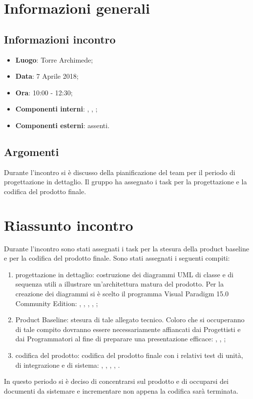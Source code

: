 \section{Informazioni generali}
\subsection{Informazioni incontro}
\begin{itemize}
\item \textbf{Luogo}: Torre Archimede;
\item \textbf{Data}: 7 Aprile 2018;
\item \textbf{Ora}: 10:00 - 12:30;
\item \textbf{Componenti interni}: \Tommaso, \Mattia, \Isacco;
\item \textbf{Componenti esterni}: assenti.
\end{itemize}

\subsection{Argomenti}
Durante l'incontro si è discusso della pianificazione del team per il periodo di progettazione in dettaglio. Il gruppo ha assegnato i task per la progettazione e la codifica del prodotto finale.

\section{Riassunto incontro}
Durante l'incontro sono stati assegnati i task per la stesura della product baseline e per la codifica del prodotto finale. Sono stati assegnati i seguenti compiti:
\begin{enumerate}
	\item progettazione in dettaglio: costruzione dei diagrammi UML di classe e di sequenza utili a illustrare un'architettura matura del prodotto. Per la creazione dei diagrammi si è scelto il programma Visual Paradigm 15.0 Community Edition: \Tommaso{}, \Mattia{}, \Luca{}, \Leonardo{}, \Cristian{};
	\item Product Baseline: stesura di tale allegato tecnico. Coloro che si occuperanno di tale compito dovranno essere necessariamente 
	affiancati dai Progettisti e dai Programmatori al fine di preparare una presentazione efficace: \Isacco{}, \Cristian{}, \Carlo{};
	\item codifica del prodotto: codifica del prodotto finale con i relativi test di unità, di integrazione e di sistema: \Mattia{}, \Luca{}, \Carlo{}, \Isacco{}, \Cristian{}.
\end{enumerate}
In questo periodo si è deciso di concentrarsi sul prodotto e di occuparsi dei documenti da sistemare e incrementare non appena la codifica sarà terminata.

